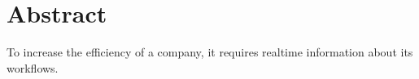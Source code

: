 \chapter*{Abstract}
\label{chap:abstract}

To increase the efficiency of a company, it requires realtime
information about its workflows. 